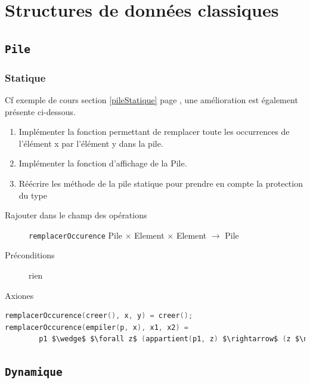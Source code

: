 \chapter{Structures de données classiques}
\section{\texttt{Pile}}
	\subsection{Statique}
	Cf exemple de cours section \ref{pileStatique} page \pageref{pileStatique}, une amélioration est également présente ci-dessous.
\begin{enumerate}
	\item Implémenter la fonction permettant de remplacer toute les occurrences de l'élément x par l'élément y dans la pile.
	\item Implémenter la fonction d'affichage de la Pile.
	\item Réécrire les méthode de la pile statique pour prendre en compte la protection du type
\end{enumerate}
\begin{description}
	\item[Rajouter dans le champ des opérations] \texttt{remplacerOccurence} Pile $\times$ Element $\times$ Element $\rightarrow$ Pile
	\item[Préconditions] rien
	\item[Axiones]
\end{description}

\begin{lstlisting}[language=C]
remplacerOccurence(creer(), x, y) = creer();
remplacerOccurence(empiler(p, x), x1, x2) = 
		p1 $\wedge$ $\forall z$ (appartient(p1, z) $\rightarrow$ (z $\neq$ x1) (empiler(p, x), z') $\wedge$ z' = x1))
\end{lstlisting}

\section{\texttt{Dynamique}}



